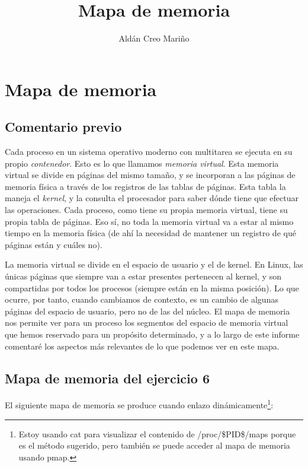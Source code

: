 \documentclass[a4paper]{article}
\title{Mapa de memoria}
\author{Aldán Creo Mariño}
\begin{document}

\section{Mapa de memoria}

\subsection{Comentario previo}

Cada proceso en un sistema operativo moderno con multitarea se ejecuta en su propio \emph{contenedor}. Esto es lo que llamamos \emph{memoria virtual}. Esta memoria virtual se divide en páginas del mismo tamaño, y se incorporan a las páginas de memoria física a través de los registros de las tablas de páginas. Esta tabla la maneja el \emph{kernel}, y la consulta el procesador para saber dónde tiene que efectuar las operaciones. Cada proceso, como tiene su propia memoria virtual, tiene su propia tabla de páginas. Eso sí, no toda la memoria virtual va a estar al mismo tiempo en la memoria física (de ahí la necesidad de mantener un registro de qué páginas están y cuáles no).

La memoria virtual se divide en el espacio de usuario y el de kernel. En Linux, las únicas páginas que siempre van a estar presentes pertenecen al kernel, y son compartidas por todos los procesos (siempre están en la misma posición). Lo que ocurre, por tanto, cuando cambiamos de contexto, es un cambio de algunas páginas del espacio de usuario, pero no de las del núcleo. El mapa de memoria nos permite ver para un proceso los segmentos del espacio de memoria virtual que hemos reservado para un propósito determinado, y a lo largo de este informe comentaré los aspectos más relevantes de lo que podemos ver en este mapa.

\subsection{Mapa de memoria del ejercicio 6}

El siguiente mapa de memoria se produce cuando enlazo dinámicamente\footnote{Estoy usando {\ttfamily cat} para visualizar el contenido de {\ttfamily /proc/\$PID\$/maps} porque es el método sugerido, pero también se puede acceder al mapa de memoria usando {\ttfamily pmap}.}:
\end{document}
